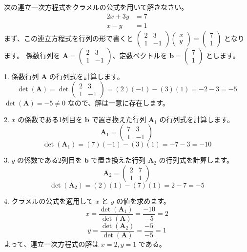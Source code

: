\begin{ex}
次の連立一次方程式をクラメルの公式を用いて解きなさい。
\begin{align*} 2x + 3y &= 7 \\ x - y &= 1 \end{align*}
まず、この連立方程式を行列の形で書くと $\begin{pmatrix} 2 & 3 \\ 1 & -1 \end{pmatrix} \begin{pmatrix} x \\ y \end{pmatrix} = \begin{pmatrix} 7 \\ 1 \end{pmatrix}$ となります。
係数行列を $\bm{A} = \begin{pmatrix} 2 & 3 \\ 1 & -1 \end{pmatrix}$、定数ベクトルを $\bm{b} = \begin{pmatrix} 7 \\ 1 \end{pmatrix}$ とします。

1. 係数行列 $\bm{A}$ の行列式を計算します。
\[ \det(\bm{A}) = \det\begin{pmatrix} 2 & 3 \\ 1 & -1 \end{pmatrix} = (2)(-1) - (3)(1) = -2 - 3 = -5 \]
$\det(\bm{A}) = -5 \neq 0$ なので、解は一意に存在します。

2. $x$ の係数である1列目を $\bm{b}$ で置き換えた行列 $\bm{A}_1$ の行列式を計算します。
\[ \bm{A}_1 = \begin{pmatrix} 7 & 3 \\ 1 & -1 \end{pmatrix} \]
\[ \det(\bm{A}_1) = (7)(-1) - (3)(1) = -7 - 3 = -10 \]

3. $y$ の係数である2列目を $\bm{b}$ で置き換えた行列 $\bm{A}_2$ の行列式を計算します。
\[ \bm{A}_2 = \begin{pmatrix} 2 & 7 \\ 1 & 1 \end{pmatrix} \]
\[ \det(\bm{A}_2) = (2)(1) - (7)(1) = 2 - 7 = -5 \]

4. クラメルの公式を適用して $x$ と $y$ の値を求めます。
\[ x = \frac{\det(\bm{A}_1)}{\det(\bm{A})} = \frac{-10}{-5} = 2 \]
\[ y = \frac{\det(\bm{A}_2)}{\det(\bm{A})} = \frac{-5}{-5} = 1 \]
よって、連立一次方程式の解は $x=2, y=1$ である。
\end{ex}

